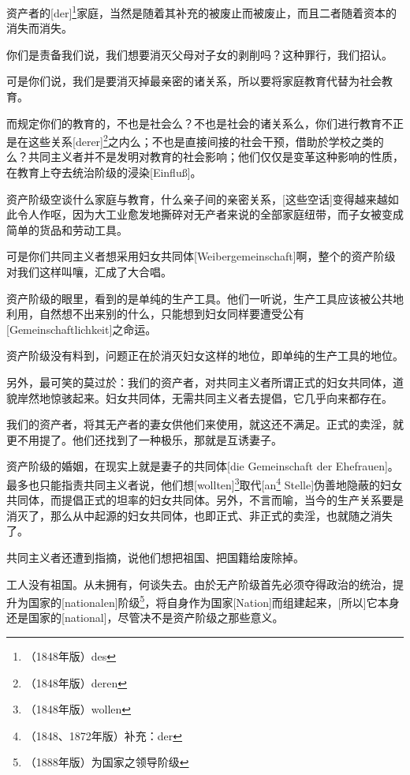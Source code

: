 \documentclass[a4paper,12pt]{ctexart}
\begin{document}
资产者的[der]\footnote{（1848年版）des}家庭，当然是随着其补充的被废止而被废止，而且二者随着资本的消失而消失。

你们是责备我们说，我们想要消灭父母对子女的剥削吗？这种罪行，我们招认。

可是你们说，我们是要消灭掉最亲密的诸关系，所以要将家庭教育代替为社会教育。

而规定你们的教育的，不也是社会么？不也是社会的诸关系么，你们进行教育不正是在这些关系[derer]\footnote{（1848年版）deren}之内么；不也是直接间接的社会干预，借助於学校之类的么？共同主义者并不是发明对教育的社会影响；他们仅仅是变革这种影响的性质，在教育上夺去统治阶级的浸染[Einfluß]。

资产阶级空谈什么家庭与教育，什么亲子间的亲密关系，[这些空话]变得越来越如此令人作呕，因为大工业愈发地撕碎对无产者来说的全部家庭纽带，而子女被变成简单的货品和劳动工具。


可是你们共同主义者想采用妇女共同体[Weibergemeinschaft]啊，整个的资产阶级对我们这样叫嚷，汇成了大合唱。

资产阶级的眼里，看到的是单纯的生产工具。他们一听说，生产工具应该被公共地利用，自然想不出来别的什么，只能想到妇女同样要遭受公有[Gemeinschaftlichkeit]之命运。

资产阶级没有料到，问题正在於消灭妇女这样的地位，即单纯的生产工具的地位。

另外，最可笑的莫过於：我们的资产者，对共同主义者所谓正式的妇女共同体，道貌岸然地惊骇起来。妇女共同体，无需共同主义者去提倡，它几乎向来都存在。

我们的资产者，将其无产者的妻女供他们来使用，就这还不满足。正式的卖淫，就更不用提了。他们还找到了一种极乐，那就是互诱妻子。

资产阶级的婚姻，在现实上就是妻子的共同体[die Gemeinschaft der  Ehefrauen]。最多也只能指责共同主义者说，他们想[wollten]\footnote{（1848年版）wollen}取代[an\footnote{（1848、1872年版）补充：der} Stelle]伪善地隐蔽的妇女共同体，而提倡正式的坦率的妇女共同体。另外，不言而喻，当今的生产关系要是消灭了，那么从中起源的妇女共同体，也即正式、非正式的卖淫，也就随之消失了。


共同主义者还遭到指摘，说他们想把祖国、把国籍给废除掉。

工人没有祖国。从未拥有，何谈失去。由於无产阶级首先必须夺得政治的统治，提升为国家的[nationalen]阶级\footnote{（1888年版）为国家之领导阶级}，将自身作为国家[Nation]而组建起来，[所以]它本身还是国家的[national]，尽管决不是资产阶级之那些意义。
\end{document}
